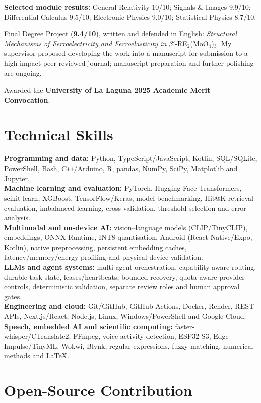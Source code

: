 \documentclass[10pt,a4paper]{article}
\begin{document}
\textbf{Selected module results:} General Relativity 10/10; Signals \& Images 9.9/10; Differential Calculus 9.5/10; Electronic Physics 9.0/10; Statistical Physics 8.7/10.

Final Degree Project (\textbf{9.4/10}), written and defended in English: \textit{Structural Mechanisms of Ferroelectricity and Ferroelasticity in} $\beta'$-RE$_2$(MoO$_4$)$_3$. My supervisor proposed developing the work into a manuscript for submission to a high-impact peer-reviewed journal; manuscript preparation and further polishing are ongoing.

Awarded the \textbf{University of La Laguna 2025 Academic Merit Convocation}.

\section{Technical Skills}

\textbf{Programming and data:}
Python, TypeScript/JavaScript, Kotlin, SQL/SQLite, PowerShell, Bash, C\texttt{++}/Arduino, R, pandas, NumPy, SciPy, Matplotlib and Jupyter.\\
\textbf{Machine learning and evaluation:}
PyTorch, Hugging Face Transformers, scikit-learn, XGBoost, TensorFlow/Keras, model benchmarking, Hit@K retrieval evaluation, imbalanced learning, cross-validation, threshold selection and error analysis.\\
\textbf{Multimodal and on-device AI:}
vision--language models (CLIP/TinyCLIP), embeddings, ONNX Runtime, INT8 quantisation, Android (React Native/Expo, Kotlin), native preprocessing, persistent embedding caches, latency/memory/energy profiling and physical-device validation.\\
\textbf{LLMs and agent systems:}
multi-agent orchestration, capability-aware routing, durable task state, leases/heartbeats, bounded recovery, quota-aware provider controls, deterministic validation, separate review roles and human approval gates.\\
\textbf{Engineering and cloud:}
Git/GitHub, GitHub Actions, Docker, Render, REST APIs, Next.js/React, Node.js, Linux, Windows/PowerShell and Google Cloud.\\
\textbf{Speech, embedded AI and scientific computing:}
faster-whisper/CTranslate2, FFmpeg, voice-activity detection, ESP32-S3, Edge Impulse/TinyML, Wokwi, Blynk, regular expressions, fuzzy matching, numerical methods and LaTeX.

\section{Open-Source Contribution}
\end{document}
